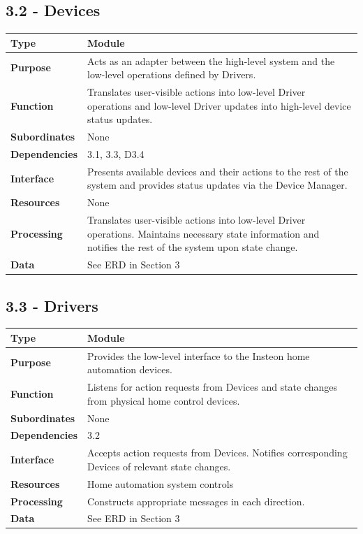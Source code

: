 \documentclass{article}
\begin{document}
\subsection*{3.2 - Devices}
\begin{tabular}{ | l |  p{13.3cm} |}
\hline
\textbf{Type} & Module \\ \hline
\textbf{Purpose} & Acts as an adapter between the high-level system and the
low-level operations defined by Drivers. \\ \hline
\textbf{Function} & Translates user-visible actions into low-level Driver
operations and low-level Driver updates into high-level device status updates.
\\ \hline
\textbf{Subordinates} & None \\ \hline
\textbf{Dependencies} & 3.1, 3.3, D3.4 \\ \hline
\textbf{Interface} & Presents available devices and their actions to the
rest of the system and provides status updates via the Device Manager. \\ \hline
\textbf{Resources} & None \\ \hline
\textbf{Processing} & Translates user-visible actions into low-level Driver
operations. Maintains necessary state information and notifies the rest of the
system upon state change. \\ \hline
\textbf{Data} & See ERD in Section 3 \\ \hline
\end{tabular}

\subsection*{3.3 - Drivers}
\begin{tabular}{ | l |  p{13.3cm} |}
\hline
\textbf{Type} & Module \\ \hline
\textbf{Purpose} & Provides the low-level interface to the Insteon home
automation devices. \\ \hline
\textbf{Function} & Listens for action requests from Devices and state changes
from physical home control devices. \\ \hline
\textbf{Subordinates} & None \\ \hline
\textbf{Dependencies} & 3.2 \\ \hline
\textbf{Interface} & Accepts action requests from Devices. Notifies
corresponding Devices of relevant state changes. \\ \hline
\textbf{Resources} & Home automation system controls \\ \hline
\textbf{Processing} & Constructs appropriate messages in each direction. \\ \hline
\textbf{Data} & See ERD in Section 3 \\ \hline
\end{tabular}
\end{document}
